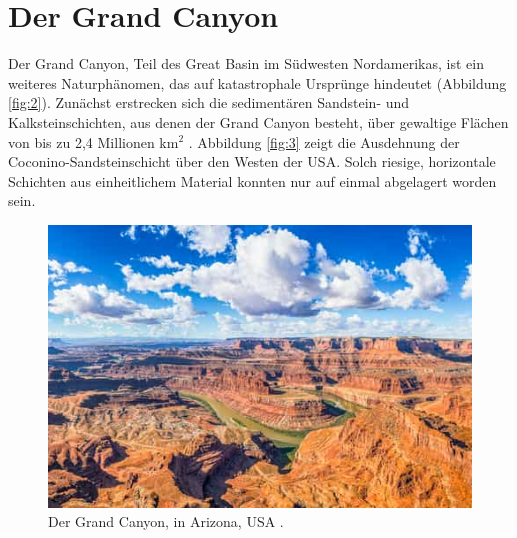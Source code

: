 \documentclass[10pt,twocolumn,letterpaper]{article}
\begin{document}
\section{Der Grand Canyon}

Der Grand Canyon, Teil des Great Basin im Südwesten Nordamerikas, ist ein weiteres Naturphänomen, das auf katastrophale Ursprünge hindeutet (Abbildung \ref{fig:2}). Zunächst erstrecken sich die sedimentären Sandstein- und Kalksteinschichten, aus denen der Grand Canyon besteht, über gewaltige Flächen von bis zu 2,4 Millionen km$^2$ \cite{21}. Abbildung \ref{fig:3} zeigt die Ausdehnung der Coconino-Sandsteinschicht über den Westen der USA. Solch riesige, horizontale Schichten aus einheitlichem Material konnten nur auf einmal abgelagert worden sein.

\begin{figure}[b]
\begin{center}
   \includegraphics[width=1\linewidth]{grand-canyon.jpg}
\end{center}
   \caption{Der Grand Canyon, in Arizona, USA \cite{49}.}
\label{fig:2}
\label{fig:onecol}
\end{figure}
\end{document}
